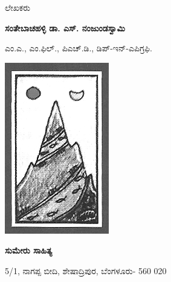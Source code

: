 \thispagestyle{empty}


\vfill

\begin{center}
ಲೇಖಕರು

{\Large\textbf{ಸಂತೇಬಾಚಹಳ್ಳಿ ಡಾ. ಎಸ್​. ನಂಜುಂಡಸ್ವಾಮಿ} }

{\small ಎಂ.ಎ., ಎಂ.ಫಿಲ್​., ಪಿಎಚ್​.ಡಿ., ಡಿಪ್​-ಇನ್​-ಎಪಿಗ್ರಫಿ.}
\end{center}

\vfill

\begin{center}
\includegraphics[scale=.3]{images/logo.png}
\end{center}

\begin{center}
{\Large\textbf{ಸುಮೇರು ಸಾಹಿತ್ಯ}} 

5/1, ನಾಗಪ್ಪ ಬೀದಿ, ಶೇಷಾದ್ರಿಪುರ, ಬೆಂಗಳೂರು- 560 020
\end{center}

